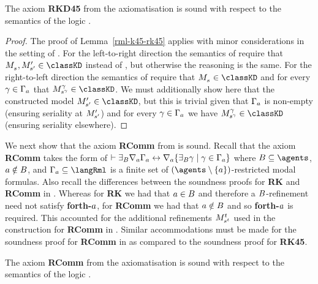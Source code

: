 \begin{lemma}\label{rml-kd45-rkd45}
The axiom {\bf RKD45} from the axiomatisation \axiomRmlKD{} is sound with respect to the semantics of the logic \logicRmlKD{}.
\end{lemma}

\begin{proof}
The proof of Lemma~\ref{rml-k45-rk45} applies with minor considerations in the setting of \logicRmlKD{}.
For the left-to-right direction the semantics of \logicRmlKD{} require that $\kPModel{\kStateS}, \kPModelP{\kStateSP} \in \classKD$ instead of \classKFF{}, but otherwise the reasoning is the same.
For the right-to-left direction the semantics of \logicRmlKD{} require that $\kPModel{\kStateS} \in \classKD$ and for every $\gamma \in \Gamma_a$ that $\kPModel[\gamma]{\kStateS[\gamma]} \in \classKD$.
We must additionally show here that the constructed model $\kPModelP{\kStateSP} \in \classKD$, but this is trivial given that $\Gamma_a$ is non-empty (ensuring seriality at ${M^{\prime}_{{s}^{\prime}}}$) and for every $\gamma \in \Gamma_a$ we have $\kPModel[\gamma]{\kStateS[\gamma]} \in \classKD$ (ensuring seriality elsewhere).
\end{proof}

We next show that the axiom {\bf RComm} from \axiomRmlKFF{} is sound.
Recall that the axiom {\bf RComm} takes the form of $\vdash {\exists_{B}} \nabla_{a} \Gamma_a \leftrightarrow \nabla_{a} \{{\exists_{B}} \gamma \mid \gamma \in \Gamma_a\}$ where $\agentsB \subseteq \agents$, $a \notin B$, and $\Gamma_\agentA \subseteq \langRml$ is a finite set of $(\agents \setminus \{\agentA\})$-restricted modal formulas.
Also recall the differences between the soundness proofs for {\bf RK} and {\bf RComm} in \axiomRmlK{}.
Whereas for {\bf RK} we had that $a \in B$ and therefore a $B$-refinement need not satisfy {\bf forth-$a$}, for {\bf RComm} we had that $a \notin B$ and so {\bf forth-$a$} is required.
This accounted for the additional refinements $\kPModel[\kStateT]{\kStateS[\kStateT]}$ used in the construction for {\bf RComm} in \axiomRmlK{}.
Similar accommodations must be made for the soundness proof for {\bf RComm} in \axiomRmlKFF{} as compared to the soundness proof for {\bf RK45}.

\begin{lemma}\label{rml-k45-rcomm}
The axiom {\bf RComm} from the axiomatisation \axiomRmlKFF{} is sound with respect to the semantics of the logic \logicRmlKFF{}.
\end{lemma}

